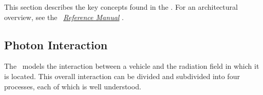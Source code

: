 %
%
%


This section describes the key concepts found in the \RadiationPressureDesc.  For an
architectural overview, see the \RadiationPressureDesc\
\href{file:refman.pdf} {\em Reference Manual} \cite{radbib:ReferenceManual}.


\subsection{Photon Interaction}

The \RadiationPressureDesc\ models the interaction between a vehicle and the
radiation field in which it is located.  This overall interaction can be
divided and subdivided into four processes, each of which is well understood.

